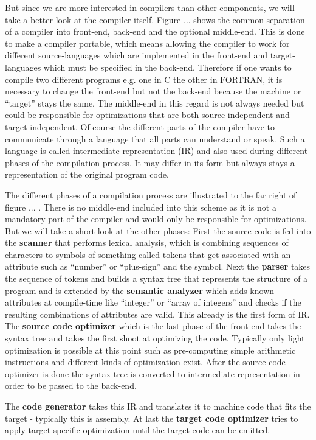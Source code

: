 But since we are more interested in compilers than other components, we will take a better look at the compiler itself.
Figure ...  shows the common separation of a compiler into front-end, back-end and the optional middle-end.
This is done to make a compiler portable, which means allowing the compiler to work for different source-languages which are implemented in the front-end and target-languages which must be specified in the back-end.
Therefore if one wants to compile two different programs e.g. one in C the other in FORTRAN, it is necessary to change the front-end but not the back-end because the machine or ``target'' stays the same.
The middle-end in this regard is not always needed but could be responsible for optimizations that are both source-independent and target-independent.
Of course the different parts of the compiler have to communicate through a language that all parts can understand or speak.
Such a language is called intermediate representation (IR) and also used during different phases of the compilation process.
It may differ in its form but always stays a representation of the original program code.

The different phases of a compilation process are illustrated to the far right of figure ... .
There is no middle-end included into this scheme as it is not a mandatory part of the compiler and would only be responsible for optimizations.
But we will take a short look at the other phases:
First the source code is fed into the \textbf{scanner} that performs lexical analysis, which is combining sequences of characters to symbols of something called tokens that get associated with an attribute such as ``number'' or ``plus-sign'' and the symbol.
Next the \textbf{parser} takes the sequence of tokens and builds a syntax tree that represents the structure of a program and is extended by the \textbf{semantic analyzer} which adds known attributes at compile-time like ``integer'' or ``array of integers'' and checks if the resulting combinations of attributes are valid.
This already is the first form of IR.
The \textbf{source code optimizer} which is the last phase of the front-end takes the syntax tree and takes the first shoot at optimizing the code.
Typically only light optimization is possible at this point such as pre-computing simple arithmetic instructions and different kinds of optimization exist.
After the source code optimizer is done the syntax tree is converted to intermediate representation in order to be passed to the back-end.

The \textbf{code generator} takes this IR and translates it to machine code that fits the target - typically this is assembly.
At last the \textbf{target code optimizer} tries to apply target-specific optimization until the target code can be emitted.

